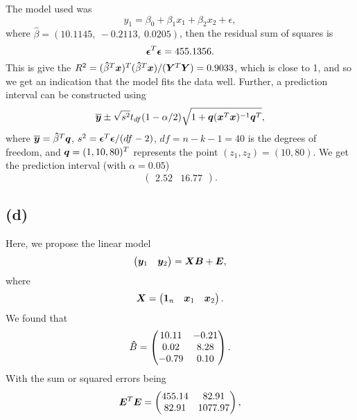 The model used was
\begin{equation*}
  y_1 = \beta_0 + \beta_1 x_1 + \beta_2 x_2 + \epsilon,
\end{equation*}
where $\hat{\beta} = (10.1145,\   -0.2113,\    0.0205)$, then the
residual sum of squares is
\begin{equation*}
  \bm{\epsilon}^{T} \bm{\epsilon} = 455.1356.
\end{equation*}
This is give the $R^{2} = (\bm{\hat} \beta^{T} \bm{x})^{T} (\bm{\hat}
\beta^{T} \bm{x})/(\bm{Y}^{T} \bm{Y}) = 0.9033$, which is close to 1, and so
we get an indication that the model fits the data well. 
Further, a prediction interval can be constructed using
\begin{equation*}
  \overline{\bm{y}} \pm \sqrt{s^{2}}t_{df}(1 - \alpha/2)\sqrt{1 + \bm{q} (\bm{x}^{T} \bm{x})^{-1}\bm{q}^{T}},
\end{equation*}
where $\overline{\bm{y}} = \bm{\hat} \beta^{T} \bm{q}$, $s^{2} =\bm{\epsilon}^{T} \bm{\epsilon} / (df - 2) $, $df = n - k - 1
= 40$ is the degrees of freedom, and $\bm{q} = (1, 10, 80)^{T}$ represents
the point $(z_{1}, z_{2}) = (10, 80)$.  We get the prediction interval
(with $\alpha = 0.05$)
\begin{equation*}
  \begin{pmatrix}
    2.52 &16.77 
  \end{pmatrix}.
\end{equation*}

\subsection*{(d)}

Here, we propose the linear model
\begin{equation*}
  \begin{pmatrix}
    \bm{y}_1 & \bm{y}_2
  \end{pmatrix} = 
  \bm{X}\bm{B} + \bm{E},
\end{equation*}
where 
\begin{equation*}
 \bm{X} =
  \begin{pmatrix}
    \bm{1}_n & \bm{x}_1 & \bm{x}_2
  \end{pmatrix}.
\end{equation*}
We found that
\begin{equation*}
 \bm{\hat}  B =
  \begin{pmatrix}
    10.11 & -0.21 \\ 
    0.02 & 8.28 \\ 
    -0.79 & 0.10 
  \end{pmatrix}.
\end{equation*}
With the sum or squared errors being
\begin{equation*}
  \bm{E} ^{T} \bm{E} = 
  \begin{pmatrix}
    455.14 &82.91 \\ 
    82.91 &1077.97
  \end{pmatrix},
\end{equation*}

